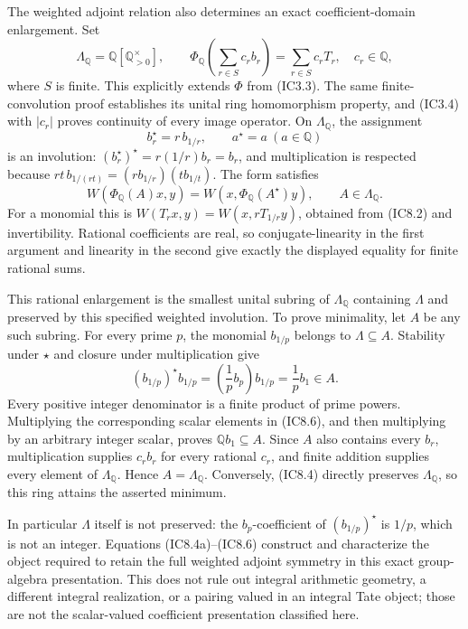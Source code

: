 \documentclass[
]{article}
\begin{document}
The weighted adjoint relation also determines an exact
coefficient-domain enlargement. Set \[
\Lambda_{\mathbb Q}=\mathbb Q[\mathbb Q_{>0}^{\times}],\qquad
\Phi_{\mathbb Q}\left(\sum_{r\in S}c_r b_r\right)
=\sum_{r\in S}c_r T_r,
\quad c_r\in\mathbb Q,
\tag{IC8.4a}
\] where \(S\) is finite. This explicitly extends \(\Phi\) from (IC3.3).
The same finite-convolution proof establishes its unital ring
homomorphism property, and (IC3.4) with \(|c_r|\) proves continuity of
every image operator. On \(\Lambda_{\mathbb Q}\), the assignment \[
b_r^{\star}=r\,b_{1/r},\qquad a^{\star}=a\ (a\in\mathbb Q)
\tag{IC8.4}
\] is an involution: \((b_r^\star)^\star=r(1/r)b_r=b_r\), and
multiplication is respected because
\(rt\,b_{1/(rt)}=(r b_{1/r})(t b_{1/t})\). The form satisfies \[
W(\Phi_{\mathbb Q}(A)x,y)
=W(x,\Phi_{\mathbb Q}(A^\star)y),
\qquad A\in\Lambda_{\mathbb Q}.
\tag{IC8.5}
\] For a monomial this is \(W(T_rx,y)=W(x,rT_{1/r}y)\), obtained from
(IC8.2) and invertibility. Rational coefficients are real, so
conjugate-linearity in the first argument and linearity in the second
give exactly the displayed equality for finite rational sums.

This rational enlargement is the smallest unital subring of
\(\Lambda_{\mathbb Q}\) containing \(\Lambda\) and preserved by this
specified weighted involution. To prove minimality, let \(A\) be any
such subring. For every prime \(p\), the monomial \(b_{1/p}\) belongs to
\(\Lambda\subseteq A\). Stability under \(\star\) and closure under
multiplication give \[
(b_{1/p})^\star b_{1/p}
=\left(\frac1p b_p\right)b_{1/p}
=\frac1p b_1\in A.
\tag{IC8.6}
\] Every positive integer denominator is a finite product of prime
powers. Multiplying the corresponding scalar elements in (IC8.6), and
then multiplying by an arbitrary integer scalar, proves
\(\mathbb Q b_1\subseteq A\). Since \(A\) also contains every \(b_r\),
multiplication supplies \(c_r b_r\) for every rational \(c_r\), and
finite addition supplies every element of \(\Lambda_{\mathbb Q}\). Hence
\(A=\Lambda_{\mathbb Q}\). Conversely, (IC8.4) directly preserves
\(\Lambda_{\mathbb Q}\), so this ring attains the asserted minimum.

In particular \(\Lambda\) itself is not preserved: the
\(b_p\)-coefficient of \((b_{1/p})^\star\) is \(1/p\), which is not an
integer. Equations (IC8.4a)--(IC8.6) construct and characterize the
object required to retain the full weighted adjoint symmetry in this
exact group-algebra presentation. This does not rule out integral
arithmetic geometry, a different integral realization, or a pairing
valued in an integral Tate object; those are not the scalar-valued
coefficient presentation classified here.
\end{document}
